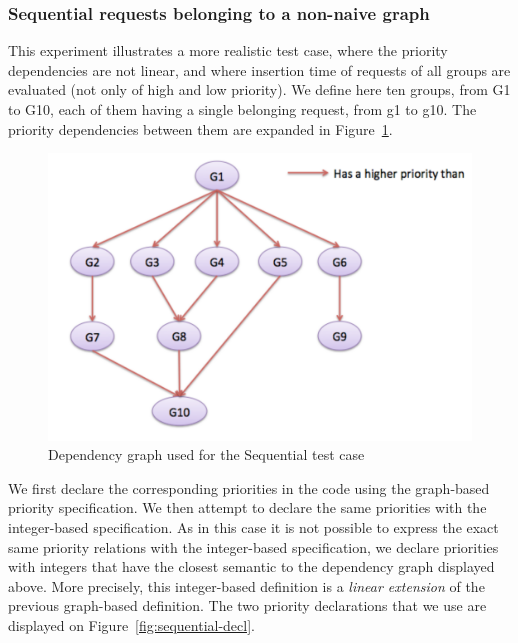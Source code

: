 \documentclass[11pt]{report}
\begin{document}
\subsubsection{Sequential requests belonging to a non-naive graph}
This experiment illustrates a more realistic test case, where the priority dependencies are not linear, and where insertion time of requests of all groups are evaluated (not only of high and low priority). We define here ten groups, from G1 to G10, each of them having a single belonging request, from g1 to g10. The priority dependencies between them are expanded in Figure~\ref{fig:complex}.

\begin{figure}[!ht]
      \begin{minipage}[c]{\textwidth}
      \centering
      \includegraphics[scale=0.5]{pictures/complex.pdf}
      \end{minipage}
      \caption{Dependency graph used for the Sequential test case}
      \label{fig:complex} 
\end{figure}

We first declare the corresponding priorities in the code using the graph-based priority specification. We then attempt to declare the same priorities with the integer-based specification. As in this case it is not possible to express the exact same priority relations with the integer-based specification, we declare priorities with integers that have the closest semantic to the dependency graph displayed above. More precisely, this integer-based definition is a \emph{linear extension} of the previous graph-based definition. The two priority declarations that we use are displayed on Figure~\ref{fig:sequential-decl}.
\end{document}
